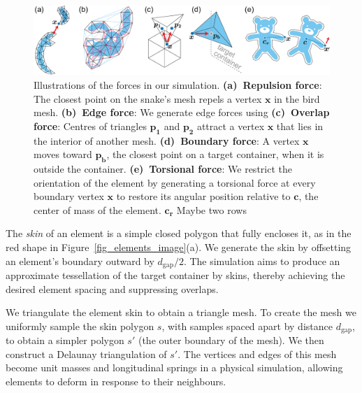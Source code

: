\begin{figure}[t]
\centering
\includegraphics[width=1.0\textwidth]{figures/repulsionpak/all_forces_new.pdf}
\caption[Forces]{
\label{fig_forces}
Illustrations of the forces in our simulation.
\;\textbf{(a)~Repulsion force}:
The closest point on the snake's mesh
repels a vertex $\bm{x}$ in the bird mesh.
\textbf{(b)~Edge force}: 
We generate edge forces using
\textbf{(c)~Overlap force}: 
Centres of triangles $\bm{p_1}$ and $\bm{p_2}$ attract a vertex
$\bm{x}$ that lies in the interior of another mesh.
\;\textbf{(d)~Boundary force}: A vertex $\bm{x}$ moves toward $\bm{p_b}$,
the closest point on a target container, when it is outside the container.
\textbf{(e)~Torsional force}: We restrict the orientation of the element by generating 
a torsional force at every boundary vertex $\bm{x}$
to restore its angular position relative to $\bm{c}$, 
the center of mass of the element.
\mynote
{
$\bm{c_r}$
Maybe two rows
}
}
\end{figure}


The \textit{skin} of an element is a simple closed polygon 
that fully encloses it, 
as in the red shape in Figure~\ref{fig_elements_image}(a).
We generate the skin 
by offsetting 
an element's boundary outward by $d_\mathrm{gap}/2$. 
The simulation aims to produce an approximate tessellation of the target
container by  skins, thereby achieving the desired element spacing and
suppressing overlaps.

We triangulate the element skin to obtain a triangle mesh.
To create the mesh we uniformly sample the skin polygon $s$, with samples
spaced apart by distance $d_\mathrm{gap}$,
to obtain a simpler polygon $s'$ (the outer boundary of the mesh).
We then construct a Delaunay triangulation of $s'$.
The vertices and edges of this mesh become unit 
masses and longitudinal
springs in a physical simulation, allowing elements to deform in response to
their neighbours.  

